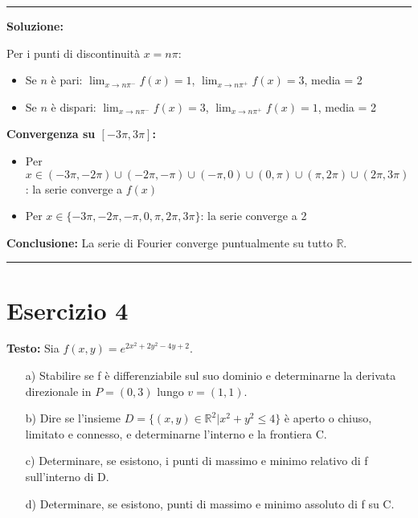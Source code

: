 \documentclass[12pt, a4paper]{article}
\newenvironment{solution}
{\par\noindent\rule{\textwidth}{0.4pt}\par\textbf{Soluzione:}\medskip\par}
{\par\rule{\textwidth}{0.4pt}\par\bigskip}
\begin{document}
\begin{solution}
Per i punti di discontinuità $x = n\pi$:
\begin{itemize}
    \item Se $n$ è pari: $\lim_{x \to n\pi^-} f(x) = 1$, $\lim_{x \to n\pi^+} f(x) = 3$, media = 2
    \item Se $n$ è dispari: $\lim_{x \to n\pi^-} f(x) = 3$, $\lim_{x \to n\pi^+} f(x) = 1$, media = 2
\end{itemize}

\textbf{Convergenza su $[-3\pi, 3\pi]$:}
\begin{itemize}
    \item Per $x \in (-3\pi, -2\pi) \cup (-2\pi, -\pi) \cup (-\pi, 0) \cup (0, \pi) \cup (\pi, 2\pi) \cup (2\pi, 3\pi)$: la serie converge a $f(x)$
    \item Per $x \in \{-3\pi, -2\pi, -\pi, 0, \pi, 2\pi, 3\pi\}$: la serie converge a 2
\end{itemize}

\textbf{Conclusione:} La serie di Fourier converge puntualmente su tutto $\mathbb{R}$.
\end{solution}

\newpage

\section*{Esercizio 4}

\textbf{Testo:} Sia $f(x,y) = e^{2x^{2}+2y^{2}-4y+2}$.
\begin{enumerate}
    \item[a)] Stabilire se f è differenziabile sul suo dominio e determinarne la derivata direzionale in $P=(0,3)$ lungo $v=(1,1)$.
    \item[b)] Dire se l'insieme $D = \{(x,y) \in \mathbb{R}^{2} | x^{2}+y^{2} \le 4\}$ è aperto o chiuso, limitato e connesso, e determinarne l'interno e la frontiera C.
    \item[c)] Determinare, se esistono, i punti di massimo e minimo relativo di f sull'interno di D.
    \item[d)] Determinare, se esistono, punti di massimo e minimo assoluto di f su C.
\end{enumerate}
\end{document}
